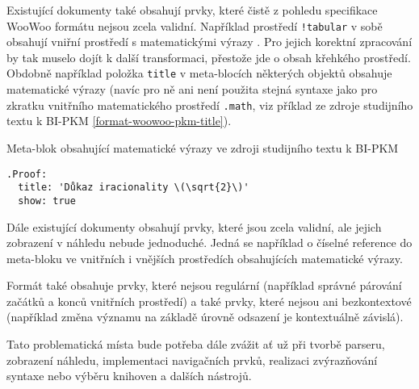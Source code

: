 Existující dokumenty také obsahují prvky, které čistě z pohledu specifikace WooWoo formátu nejsou zcela validní.
Například prostředí \texttt{!tabular} v sobě obsahují vniřní prostředí s matematickými výrazy \cite{pkm}. Pro
jejich korektní zpracování by tak muselo dojít k další transformaci, přestože jde o obsah křehkého prostředí. Obdobně
například položka \texttt{title} v meta-blocích některých objektů obsahuje matematické výrazy (navíc pro ně
ani není použita stejná syntaxe jako pro zkratku vnitřního matematického prostředí \texttt{.math}, viz příklad
ze zdroje studijního textu k BI-PKM \ref{format-woowoo-pkm-title}).

\begin{listing}
    \caption{Meta-blok obsahující matematické výrazy ve zdroji studijního textu k BI-PKM \cite{pkm}}
    \label{format-woowoo-pkm-title}
    \begin{verbatim}
.Proof:
  title: 'Důkaz iracionality \(\sqrt{2}\)'
  show: true
    \end{verbatim}
\end{listing}

Dále existující dokumenty obsahují prvky, které jsou zcela validní, ale jejich zobrazení v náhledu nebude jednoduché.
Jedná se například o číselné reference do meta-bloku ve vnitřních i vnějších prostředích obsahujících matematické
výrazy.

Formát také obsahuje prvky, které nejsou regulární (například správné párování začátků a konců vnitřních prostředí) a
také prvky, které nejsou ani bezkontextové (například změna významu na základě úrovně odsazení je kontextuálně závislá).

Tato problematická místa bude potřeba dále zvážit ať už při tvorbě parseru, zobrazení náhledu, implementaci navigačních
prvků, realizaci zvýrazňování syntaxe nebo výběru knihoven a dalších nástrojů.
